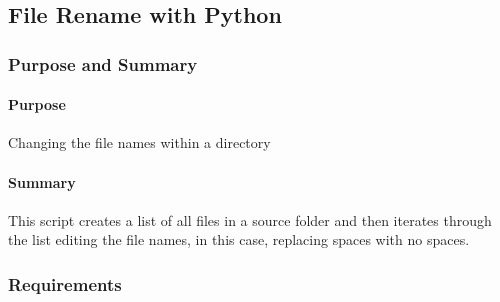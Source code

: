 %
%
\subsection{File Rename with Python}
\subsubsection{Purpose and Summary}
\paragraph{Purpose} Changing the file names within a directory
\paragraph{Summary} This script creates a list of all files in a source folder and then iterates through the list editing the file names, in this case, replacing spaces with no spaces.
\subsubsection{Requirements}
